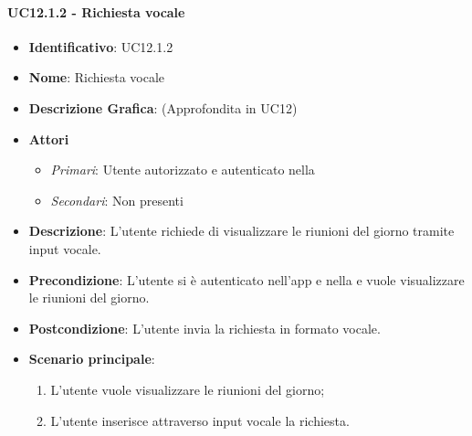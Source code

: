 \paragraph{UC12.1.2 - Richiesta vocale }
\begin{itemize}
	\item \textbf{Identificativo}: UC12.1.2
	\item \textbf{Nome}: Richiesta vocale
	\item\textbf{Descrizione Grafica}: (Approfondita in UC12)
	\item \textbf{Attori}
	\begin{itemize} 
		\item \textit{Primari}: Utente autorizzato e autenticato nella 
		\item \textit{Secondari}: Non presenti
	\end{itemize}
	\item \textbf{Descrizione}: L'utente richiede di visualizzare le riunioni del giorno tramite input vocale.
	\item \textbf{Precondizione}: L'utente si è autenticato nell'app e nella  e vuole visualizzare le riunioni del giorno.
	\item \textbf{Postcondizione}: L'utente invia la richiesta in formato vocale.
	\item \textbf{Scenario principale}:
	\begin{enumerate}
		\item L'utente vuole visualizzare le riunioni del giorno;
		\item L'utente inserisce attraverso input vocale la richiesta.
	\end{enumerate}
\end{itemize}

